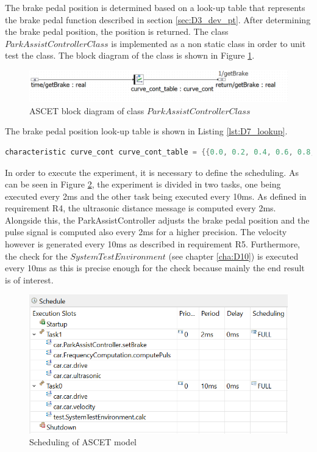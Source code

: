The brake pedal position is determined based on a look-up table that represents the brake pedal function described in section \ref{sec:D3_dev_pt}. After determining the brake pedal position, the position is returned.  The class $ParkAssistControllerClass$ is implemented as a non static class in order to unit test the class. The block diagram of the class is shown in Figure \ref{fig:BlockdiagrammParkAssistControllerClass}. 

\begin{figure}[H]
\centering
\includegraphics[width=1\textwidth]{images/Blockdiagramm_ParkAssistControllerClass.png}
\caption{ASCET block diagram of class $ParkAssistControllerClass$}
\label{fig:BlockdiagrammParkAssistControllerClass}
\end{figure}

The brake pedal position look-up table is shown in Listing \ref{lst:D7_lookup}. 

\begin{lstlisting}[language=Java,basicstyle=\scriptsize, caption= Braking pressure look up table,label= lst:D7_lookup]
characteristic curve_cont curve_cont_table = {{0.0, 0.2, 0.4, 0.6, 0.8, 1.0, 1.2}, {0.0, 0.043, 0.073, 0.078, 0.073, 0.043, 0.0}};
\end{lstlisting}

In order to execute the experiment, it is necessary to define the scheduling. As can be seen in Figure \ref{fig:D7_schedule}, the experiment is divided in two tasks, one being executed every 2ms and the other task being executed every 10ms. As defined in requirement R4, the ultrasonic distance message is computed every 2ms. Alongside this, the ParkAssistController adjusts the brake pedal position and the pulse signal is computed also every 2ms for a higher precision. The velocity however is generated every 10ms as described in requirement R5. Furthermore, the check for the $SystemTestEnvironment$ (see chapter \ref{cha:D10}) is executed every 10ms as this is precise enough for the check because mainly the end result is of interest.
 
\begin{figure}[H]
\centering
\includegraphics[width=1\textwidth]{images/pc_app.png}
\caption{Scheduling of ASCET model}
\label{fig:D7_schedule}
\end{figure}

